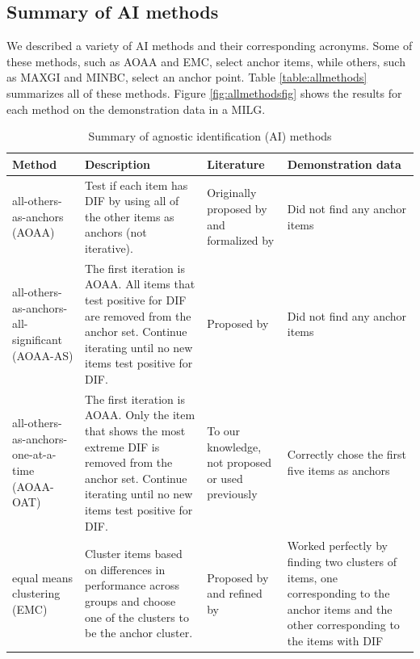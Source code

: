 \documentclass[
  11pt,
]{article}
\begin{document}
\hypertarget{summary-of-ai-methods}{%
\subsection{Summary of AI methods}\label{summary-of-ai-methods}}

We described a variety of AI methods and their corresponding acronyms. Some of these methods, such as AOAA and EMC, select anchor items, while others, such as MAXGI and MINBC, select an anchor point. Table \ref{table:allmethods} summarizes all of these methods. Figure \ref{fig:allmethodsfig} shows the results for each method on the demonstration data in a MILG.

\begin{table}[H]
\caption{Summary of agnostic identification (AI) methods}
\centering
\begin{tabular}{|p{3cm}|p{4cm}|p{3cm}|p{3cm}|}
\toprule

Method & Description & Literature & Demonstration data \\

\midrule

all-others-as-anchors (AOAA) & Test if each item has DIF by using all of the other items as anchors (not iterative). & Originally proposed by \cite{lord1980} and formalized by \cite{thissen1993detection} & Did not find any anchor items \\\hline

all-others-as-anchors-all-significant (AOAA-AS) & The first iteration is AOAA. All items that test positive for DIF are removed from the anchor set. Continue iterating until no new items test positive for DIF. & Proposed by \cite{drasgow1987study} & Did not find any anchor items \\\hline

all-others-as-anchors-one-at-a-time (AOAA-OAT) & The first iteration is AOAA. Only the item that shows the most extreme DIF is removed from the anchor set. Continue iterating until no new items test positive for DIF. & To our knowledge, not proposed or used previously & Correctly chose the first five items as anchors \\\hline

equal means clustering (EMC) & Cluster items based on differences in performance across groups and choose one of the clusters to be the anchor cluster. & Proposed by \cite{bechger2015statistical} and refined by \cite{pohl2017cluster} & Worked perfectly by finding two clusters of items, one corresponding to the anchor items and the other corresponding to the items with DIF \\\hline


\end{tabular}
\end{table}
\end{document}
